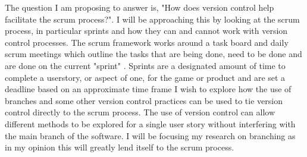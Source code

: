 \documentclass[10pt,a4paper]{article}
\author{Connor Seán Rodgers}
\begin{document}
The question I am proposing to answer is, "How does version control help facilitate the scrum process?".  I will be approaching this by looking at the scrum process, in particular sprints and how they can and cannot work with version control processes. The scrum framework works around a task board and daily scrum meetings which outline the tasks that are being done, need to be done and are done on the current "sprint" \cite{rubart2009supporting}. Sprints are a designated amount of time to complete a userstory, or aspect of one, for the game or product and are set a deadline based on an approximate time frame \cite{dinakar2009agile} I wish to explore how the use of branches \cite {phillips2011branching} and some other version control practices can be used to tie version control directly to the scrum process. The use of version control can allow different methods to be explored for a single user story without interfering with the main branch of the software\cite {mikami2017micro}. I will be focusing my research on branching as in my opinion this will greatly lend itself to the scrum process\cite{rayana2016gitwaterflow}\cite{krusche2016teaching}.

{}

\end{document}
